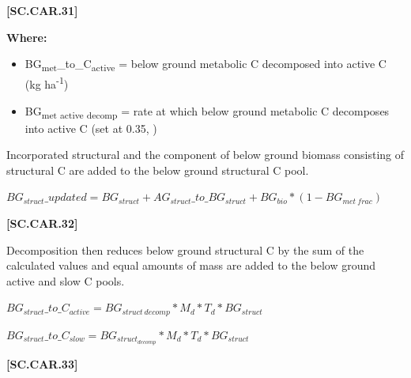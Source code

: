             {\raggedleft \textbf{[SC.CAR.31]}\par}
            \vspace{0.5cm}

        \textbf{Where:}
            
        \begin{itemize}
            \item BG\textsubscript{met}\_to\_C\textsubscript{active} = below ground metabolic C decomposed into active C (kg ha\textsuperscript{-1})
            \item BG\textsubscript{met active decomp} =	rate at which below ground metabolic C decomposes into	active C (set at 0.35, \cite{parton1987analysis})
        \end{itemize}
        \vspace{0.5cm}

Incorporated structural and the component of below ground biomass consisting of structural C are added to the below ground structural C pool.
        \vspace{0.5cm}

    \begin{center}
\(BG_{struct}\_updated=BG_{struct} + AG_{struct}\_to\_BG_{struct}+BG_{bio} * (1-BG_{met\ frac})\)
    \end{center}
        \vspace{0.5cm} 
    
            {\raggedleft \textbf{[SC.CAR.32]}\par}
            \vspace{0.5cm}

Decomposition then reduces below ground structural C  by the sum of the calculated values and equal amounts of mass are added to the below ground active and slow C pools.
        \vspace{0.5cm}

    \begin{center}
\(BG_{struct}\_to\_C_{active}=BG_{struct\ decomp} * M_d * T_d * BG_{struct}\)
\vspace{0.1cm}

\(BG_{struct}\_to\_C_{slow}=BG_{struct_{decomp}} * M_d * T_d * BG_{struct}\)

    \end{center}
        \vspace{0.5cm} 
    
            {\raggedleft \textbf{[SC.CAR.33]}\par}
            \vspace{0.5cm}

